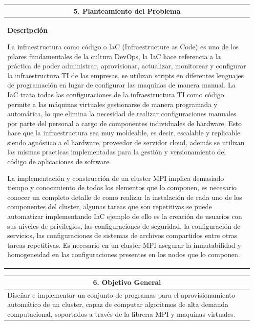 \documentclass[letter,12pt]{article}
\begin{document}
\begin{center}
\begin{tabular}{|p{15.5cm}|}
\hline
\multicolumn{1}{|c|}{ \textbf{5. Planteamiento del Problema} }\\
\hline
\textbf{Descripción}

La infraestructura como código o IaC (Infraestructure as Code) es uno de los pilares fundamentales de la cultura DevOps, la IaC hace referencia a la práctica de poder administrar, aprovisionar, actualizar, monitorear y configurar la infraestructura TI de las empresas, se utilizan scripts en diferentes lenguajes de programación en lugar de configurar las maquinas de manera manual. La IaC trata todas las configuraciones de la infraestructura TI como código permite a las máquinas virtuales gestionarse de manera programada y automática, lo que elimina la necesidad de realizar configuraciones manuales por parte del personal a cargo de componentes individuales de hardware. Esto hace que la infraestructura sea muy moldeable, es decir, escalable y replicable siendo agnóstico a el hardware, proveedor de servidor cloud, además se utilizan las mismas practicas implementadas para la gestión y versionamiento del código de aplicaciones de software. 

La implementación y construcción de un cluster MPI implica demasiado tiempo y conocimiento de todos los elementos que lo componen, es necesario conocer un completo detalle de como realizar la instalación de cada uno de los componentes del cluster, algunas tareas que son repetitivas se puede automatizar implementando IaC ejemplo de ello es la creación de usuarios con sus niveles de privilegios, las configuraciones de seguridad, la configuración de servicios, las configuraciones de sistemas de archivos compartidos entre otras tareas repetitivas. Es necesario en un cluster MPI asegurar la inmutabilidad y homogeneidad en las configuraciones presentes en los nodos que lo componen.

\hline
\end{tabular}
\end{center}

\begin{center}
\begin{tabular}{|p{15.5cm}|}
\hline
\multicolumn{1}{|c|}{ \textbf{6. Objetivo General}}\\
\hline
Diseñar e implementar un conjunto de programas para el aprovisionamiento automático de un cluster, capaz de computar algoritmos de alta demanda computacional, soportados a través de la librerıa MPI y maquinas virtuales.
\\
\hline
\end{tabular}
\end{center}
\end{document}
